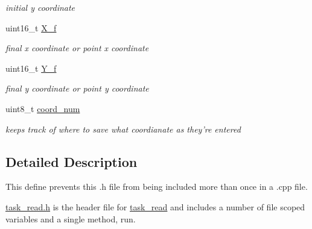 \begin{DoxyCompactItemize}
\begin{DoxyCompactList}\small\item\em initial y coordinate \end{DoxyCompactList}\item 
\hypertarget{classtask__read_a45ee53e6563d1c78e648a2cb83128e84}{uint16\-\_\-t \hyperlink{classtask__read_a45ee53e6563d1c78e648a2cb83128e84}{X\-\_\-f}}\label{classtask__read_a45ee53e6563d1c78e648a2cb83128e84}

\begin{DoxyCompactList}\small\item\em final x coordinate or point x coordinate \end{DoxyCompactList}\item 
\hypertarget{classtask__read_afa1659ce594c1d8ffec4faed638919fb}{uint16\-\_\-t \hyperlink{classtask__read_afa1659ce594c1d8ffec4faed638919fb}{Y\-\_\-f}}\label{classtask__read_afa1659ce594c1d8ffec4faed638919fb}

\begin{DoxyCompactList}\small\item\em final y coordinate or point y coordinate \end{DoxyCompactList}\item 
\hypertarget{classtask__read_ae0192fd60c1c29fde6aad37ea5fc8bcd}{uint8\-\_\-t \hyperlink{classtask__read_ae0192fd60c1c29fde6aad37ea5fc8bcd}{coord\-\_\-num}}\label{classtask__read_ae0192fd60c1c29fde6aad37ea5fc8bcd}

\begin{DoxyCompactList}\small\item\em keeps track of where to save what coordianate as they're entered \end{DoxyCompactList}\end{DoxyCompactItemize}


\subsection{Detailed Description}
This define prevents this .h file from being included more than once in a .cpp file. 

\hyperlink{task__read_8h_source}{task\-\_\-read.\-h} is the header file for \hyperlink{classtask__read}{task\-\_\-read} and includes a number of file scoped variables and a single method, run. 

